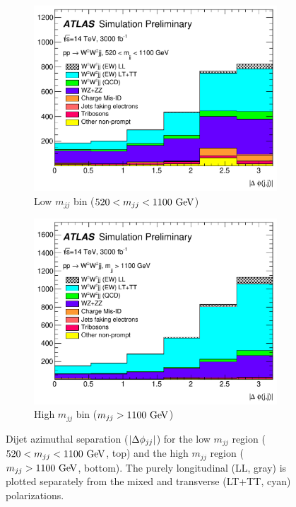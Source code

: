 \begin{figure}[htbp]
  \centering
  \begin{subfigure}[b]{.6\textwidth}
    \includegraphics[width=\textwidth]{figs/ssww_upgrade/results/plots_optimisedLL_all_pass9_dijet_absdphijj_lowmjj-cropped}
    \caption{Low $m_{jj}$ bin ($520 < m_{jj} < 1100\gev$)}
    \label{fig:sswwupgrade_dphijj_LL_low}
  \end{subfigure}
  \begin{subfigure}[b]{.6\textwidth}
    \includegraphics[width=\textwidth]{figs/ssww_upgrade/results/plots_optimisedLL_all_pass9_dijet_absdphijj_highmjj-cropped}
    \caption{High $m_{jj}$ bin ($m_{jj} > 1100\gev$)}
    \label{fig:sswwupgrade_dphijj_LL_high}
  \end{subfigure}
  \caption{Dijet azimuthal separation ($|\Delta\phi_{jj}|$) for the low $m_{jj}$ region ($520 < m_{jj} < 1100\gev$, top) and the high $m_{jj}$ region ($m_{jj} > 1100\gev$, bottom).  The purely longitudinal (LL, gray) is plotted separately from the mixed and transverse (LT+TT, cyan) polarizations.}
  \label{fig:sswwupgrade_dphijj_LL}
\end{figure}

